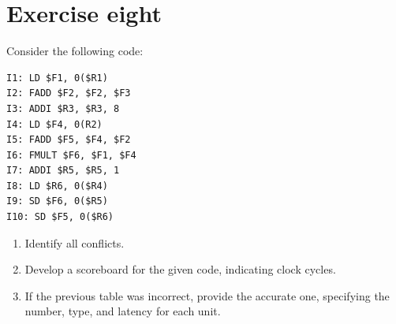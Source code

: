 \section{Exercise eight}

Consider the following code:
\begin{verbatim}
I1: LD $F1, 0($R1)
I2: FADD $F2, $F2, $F3
I3: ADDI $R3, $R3, 8
I4: LD $F4, 0(R2)
I5: FADD $F5, $F4, $F2
I6: FMULT $F6, $F1, $F4
I7: ADDI $R5, $R5, 1
I8: LD $R6, 0($R4)
I9: SD $F6, 0($R5)
I10: SD $F5, 0($R6)
\end{verbatim}
\begin{enumerate}
    \item Identify all conflicts.
    \item Develop a scoreboard for the given code, indicating clock cycles.
    \item If the previous table was incorrect, provide the accurate one, specifying the number, type, and latency for each unit.
\end{enumerate}

